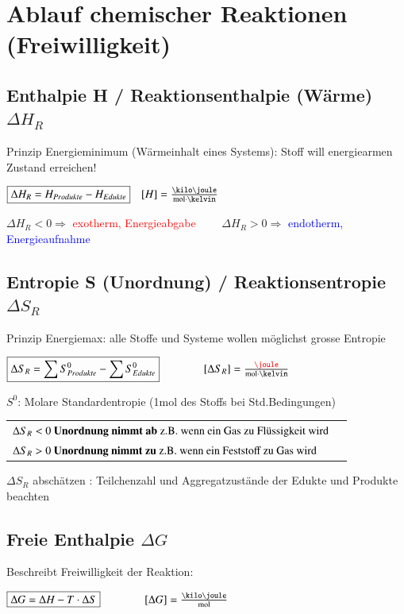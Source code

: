 \section{Ablauf chemischer Reaktionen (Freiwilligkeit)}

\subsection{Enthalpie H / Reaktionsenthalpie (Wärme) $\Delta H_R$}
    Prinzip Energieminimum (Wärmeinhalt eines Systems): Stoff will energiearmen Zustand erreichen!

    $\boxed{\Delta H_R = H_{Produkte} - H_{Edukte}} \quad [H] = \frac{\kilo\joule}{\mol \cdot \kelvin}$

    $\Delta H_R < 0 \Rightarrow$ \textcolor{red}{exotherm, Energieabgabe} $\qquad \Delta H_R > 0 \Rightarrow$ \textcolor{blue}{endotherm, Energieaufnahme}

\subsection{Entropie S (Unordnung) / Reaktionsentropie $\Delta S_R$}
    Prinzip Energiemax: alle Stoffe und Systeme wollen möglichst grosse Entropie

    $\boxed{\Delta S_R = \sum S^0_{Produkte} - \sum S^0_{Edukte}} \qquad \qquad [\Delta S_R] = \frac{\color{red}\joule}{\mol \cdot \kelvin}$

    $S^0$: Molare Standardentropie (1mol des Stoffs bei Std.Bedingungen)

\begin{tabular}{l l}
	$\Delta S_R < 0 \text{  \textbf{Unordnung nimmt ab} z.B. wenn ein Gas zu Flüssigkeit wird}$ &  \\
	$\Delta S_R > 0 \text{  \textbf{Unordnung nimmt zu} z.B. wenn ein Feststoff zu Gas wird}$     &  \\
\end{tabular}

    $\Delta S_R$ abschätzen : Teilchenzahl und Aggregatzustände der Edukte und Produkte beachten

\subsection{Freie Enthalpie $\Delta G$}
    Beschreibt Freiwilligkeit der Reaktion:

    $\boxed{\Delta G = \Delta H - T \cdot \Delta S} \qquad \qquad [\Delta G] = \frac{\kilo\joule}{\mol}$

